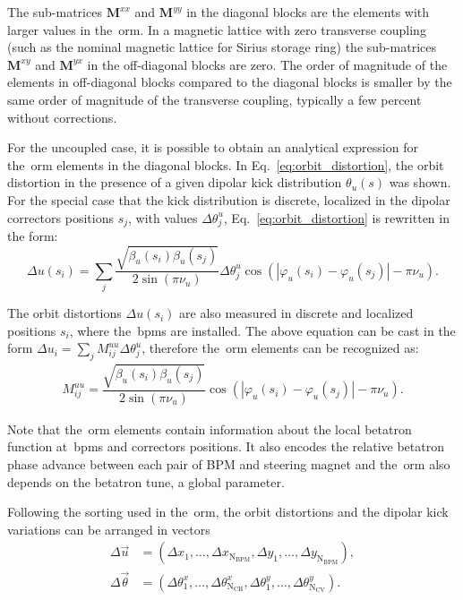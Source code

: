The sub-matrices $\mathbf{M}^{xx}$ and $\mathbf{M}^{yy}$ in the diagonal blocks are the elements with larger values in the~\gls{orm}. In a magnetic lattice with zero transverse coupling (such as the nominal magnetic lattice for Sirius storage ring) the sub-matrices $\mathbf{M}^{xy}$ and $\mathbf{M}^{yx}$ in the off-diagonal blocks are zero. The order of magnitude of the elements in off-diagonal blocks compared to the diagonal blocks is smaller by the same order of magnitude of the transverse coupling, typically a few percent without corrections.

For the uncoupled case, it is possible to obtain an analytical expression for the~\gls{orm} elements in the diagonal blocks. In Eq.~\eqref{eq:orbit_distortion}, the orbit distortion in the presence of a given dipolar kick distribution $\theta_u(s)$ was shown. For the special case that the kick distribution is discrete, localized in the dipolar correctors positions $s_j$, with values $\Delta \theta^{u}_{j}$, Eq.~\eqref{eq:orbit_distortion} is rewritten in the form:
\begin{equation}
    \Delta u(s_i) = \sum_{j} \dfrac{\sqrt{\beta_{u}(s_i)\beta_{u}(s_j)}}{2\sin\left(\pi\nu_{u}\right)} \Delta \theta^{u}_j \cos\left( |\varphi_{u}(s_i) - \varphi_{u}(s_j)| - \pi\nu_{u} \right).
    \label{eq:discrete_orbit_distortion}
\end{equation}

The orbit distortions $\Delta u(s_i)$ are also measured in discrete and localized positions $s_i$, where the~\gls{bpm}s are installed. The above equation can be cast in the form $\Delta u_i = \sum_{j} M_{ij}^{uu} \Delta \theta_{j}^{u}$, therefore the~\gls{orm} elements can be recognized as:
\begin{align}
M_{ij}^{uu} = \dfrac{\sqrt{\beta_{u}(s_i)\beta_{u}(s_j)}}{2\sin\left(\pi\nu_{u}\right)}\cos\left( |\varphi_{u}(s_i) - \varphi_{u}(s_j)| - \pi\nu_{u} \right).
\label{eq:matrix_elements}
\end{align}

Note that the~\gls{orm} elements contain information about the local betatron function at~\gls{bpm}s and correctors positions. It also encodes the relative betatron phase advance between each pair of BPM and steering magnet and the~\gls{orm} also depends on the betatron tune, a global parameter. 

Following the sorting used in the~\gls{orm}, the orbit distortions and the dipolar kick variations can be arranged in vectors
\begin{align*}
    \Delta \vec{u} &= \left(\Delta x_1, \ldots, \Delta x_{\mathrm{N}_{\mathrm{BPM}}}, \Delta y_1, \ldots, \Delta y_{\mathrm{N}_{\mathrm{BPM}}}\right), \\
    \Delta \vec{\theta} &= \left(\Delta \theta_1^x, \ldots, \Delta \theta_{\mathrm{N}_{\mathrm{CH}}}^x, \Delta \theta_1^y, \ldots, \Delta \theta_{\mathrm{N}_{\mathrm{CV}}}^y\right).
\end{align*}

